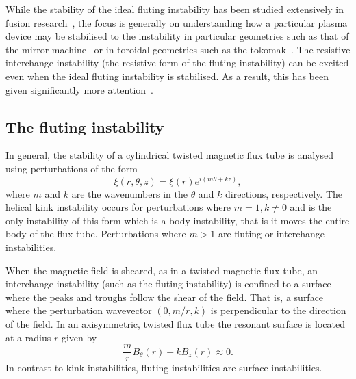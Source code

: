 While the stability of the ideal fluting instability has been studied extensively in fusion research~\cite{mikhailovskiiInstabilitiesConfinedPlasma1998,zhengAdvancedTokamakStability2015,wessonHydromagneticStabilityTokamaks1978}, the focus is generally on understanding how a particular plasma device may be stabilised to the instability in particular geometries such as that of the mirror machine~\cite{jungwirthTheoryFluteInstability1965} or in toroidal geometries such as the tokomak~\cite{shafranovFluteInstabilityCurrentcarrying1968}. The resistive interchange instability (the resistive form of the fluting instability) can be excited even when the ideal fluting instability is stabilised. As a result, this has been given significantly more attention~\cite{johnsonResistiveInterchangesNegativeV1967,correa-restrepoResistiveBallooningModes1983}.

\subsection{The fluting instability}

In general, the stability of a cylindrical twisted magnetic flux tube is analysed using perturbations of the form
\begin{equation}
  \label{eq:kink_perturbation}
\xi(r, \theta, z) = \xi(r) e^{i(m\theta + kz)},
\end{equation}
where $m$ and $k$ are the wavenumbers in the $\theta$ and $k$ directions, respectively. The helical kink instability occurs for perturbations where $m=1, k\ne0$ and is the only instability of this form which is a body instability, that is it moves the entire body of the flux tube. Perturbations where $m>1$ are fluting or interchange instabilities.

When the magnetic field is sheared, as in a twisted magnetic flux tube, an interchange instability (such as the fluting instability) is confined to a surface where the peaks and troughs follow the shear of the field. That is, a surface where the perturbation wavevector $(0, m/r, k)$ is perpendicular to the direction of the field. In an axisymmetric, twisted flux tube the resonant surface is located at a radius $r$ given by
\begin{equation}
  \label{eq:resonant_surface}
\frac{m}{r} B_{\theta}(r) + kB_z(r) \approx 0.
\end{equation}
In contrast to kink instabilities, fluting instabilities are surface instabilities.

